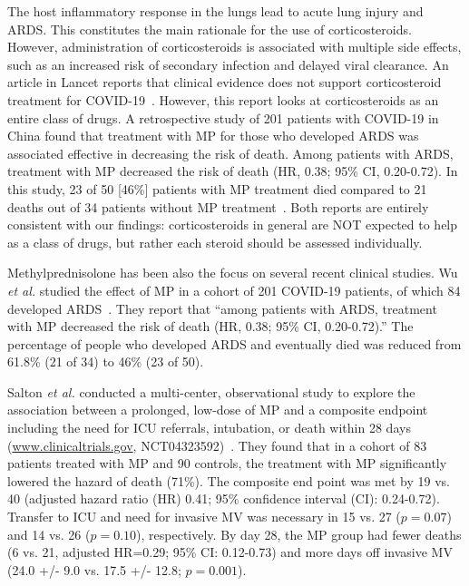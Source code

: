 \documentclass[Minh_PhD_thesis.tex]{subfiles}
\begin{document}
The host inflammatory response in the lungs lead to acute lung injury and ARDS. This constitutes the main rationale for the use of corticosteroids. However, administration of corticosteroids is associated with multiple side effects, such as an increased risk of secondary infection and delayed viral clearance. An article in Lancet reports that clinical evidence does not support corticosteroid treatment for COVID-19~\cite{russell2020clinical}. However, this report looks at corticosteroids as an entire class of drugs. A retrospective study of 201 patients with COVID-19 in China found that treatment with MP for those who developed ARDS was associated effective in decreasing the risk of death. Among patients with ARDS, treatment with MP decreased the risk of death (HR, 0.38; 95\% CI, 0.20-0.72). In this study, 23 of 50 [46\%] patients with MP treatment died compared to 21 deaths out of  34 patients without MP treatment~\cite{wu2020risk}. Both reports are entirely consistent with our findings: corticosteroids in general are NOT expected to help as a class of drugs, but rather each steroid should be assessed individually.


Methylprednisolone has been also the focus on several recent clinical studies. Wu \emph{et al.} studied the effect of MP  in a cohort of 201 COVID-19 patients, of which 84 developed ARDS~\cite{WuRiskFactorsCOVID:2020}.  They report that ``among patients with ARDS, treatment with MP decreased the risk of death (HR, 0.38; 95\% CI, 0.20-0.72).'' The percentage of people who developed ARDS and eventually died was reduced from  61.8\% (21 of 34) to 46\% (23 of 50).

Salton \emph{et al.}  conducted a multi-center, observational study to explore the association between a prolonged, low-dose of MP and a composite endpoint including the need for ICU referrals, intubation, or death within 28 days (\href{www.clinicaltrials.gov}{www.clinicaltrials.gov}, NCT04323592)~\cite{salton2020prolonged}. They found that in a cohort of 83 patients treated with MP and 90 controls, the treatment with MP significantly lowered the hazard of death (71\%). The composite end point was met by 19 vs. 40 (adjusted hazard ratio (HR) 0.41; 95\% confidence interval (CI): 0.24-0.72). Transfer to ICU and need for invasive MV was necessary in 15 vs. 27 ($p=0.07$) and 14 vs. 26 ($p=0.10$), respectively. By day 28, the MP group had fewer deaths (6 vs. 21, adjusted HR=0.29; 95\% CI: 0.12-0.73) and more days off invasive MV (24.0 +/- 9.0 vs. 17.5 +/- 12.8; $p=0.001$).
\end{document}
